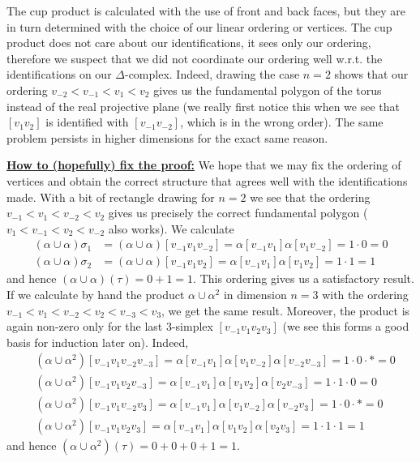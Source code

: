 \documentclass[a4paper, 12pt]{article}
\begin{document}
The cup product is calculated with the use of front and back faces, but they are in turn determined with the choice of our linear ordering or vertices. The cup product does not care about our identifications, it sees only our ordering, therefore we suspect that we did not coordinate our ordering well w.r.t. the identifications on our $\Delta$-complex. Indeed, drawing the case $n=2$ shows that our ordering $v_{-2}<v_{-1}<v_1<v_2$ gives us the fundamental polygon of the torus instead of the real projective plane (we really first notice this when we see that $[v_1v_2]$ is identified with $[v_{-1}v_{-2}]$, which is in the wrong order). The same problem persists in higher dimensions for the exact same reason.
\newline

\underline{\textbf{How to (hopefully) fix the proof:}}
We hope that we may fix the ordering of vertices and obtain the correct structure that agrees well with the identifications made. With a bit of rectangle drawing for $n=2$ we see that the ordering $v_{-1}<v_{1}<v_{-2}<v_2$ gives us precisely the correct fundamental polygon ($v_1<v_{-1}<v_2<v_{-2}$ also works). We calculate
\begin{align*}
(\alpha \cup \alpha)\sigma_1 &= (\alpha \cup \alpha)[v_{-1}v_1v_{-2}] = \alpha[v_{-1}v_1]\alpha[v_1v_{-2}] = 1\cdot 0 = 0 \\
(\alpha \cup \alpha)\sigma_2 &=(\alpha \cup \alpha)[v_{-1}v_1v_{2}] = \alpha[v_{-1}v_1]\alpha[v_1v_{2}] = 1 \cdot 1 = 1
\end{align*}
and hence $(\alpha \cup \alpha)(\tau) = 0 + 1 = 1$. This ordering gives us a satisfactory result.
If we calculate by hand the product $\alpha \cup \alpha^2$ in dimension $n = 3$ with the ordering $v_{-1}<v_{1}<v_{-2}<v_2<v_{-3}<v_3$, we get the same result. Moreover, the product is again non-zero only for the last $3$-simplex $[v_{-1}v_1v_2v_3]$ (we see this forms a good basis for induction later on). Indeed,
\begin{align*}
&(\alpha \cup \alpha^2)[v_{-1}v_1v_{-2}v_{-3}] = \alpha[v_{-1}v_1]\alpha[v_1v_{-2}]\alpha[v_{-2}v_{-3}] = 1 \cdot 0 \cdot * = 0  \\
&(\alpha \cup \alpha^2)[v_{-1}v_1v_{2}v_{-3}] = \alpha[v_{-1}v_1]\alpha[v_1v_{2}]\alpha[v_{2}v_{-3}] = 1 \cdot 1 \cdot 0 = 0 \\
&(\alpha \cup \alpha^2)[v_{-1}v_1v_{-2}v_{3}] = \alpha[v_{-1}v_1]\alpha[v_1v_{-2}]\alpha[v_{-2}v_{3}] = 1 \cdot 0 \cdot * = 0 \\
&(\alpha \cup \alpha^2)[v_{-1}v_1v_{2}v_{3}] = \alpha[v_{-1}v_1]\alpha[v_1v_{2}]\alpha[v_{2}v_{3}] = 1 \cdot 1 \cdot 1 = 1
\end{align*}
and hence $(\alpha\cup\alpha^2)(\tau) = 0 + 0 + 0 + 1 = 1$.
\end{document}
